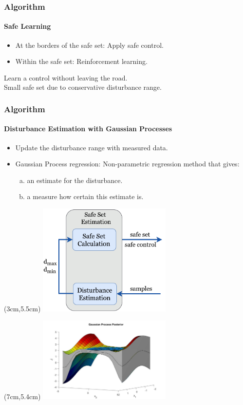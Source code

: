 \documentclass[t]{beamer}
\begin{document}
\begin{frame}
\frametitle{Algorithm}
\framesubtitle{Safe Learning}
\begin{itemize}
\item At the borders of the safe set: Apply safe control.
\item Within the safe set: Reinforcement learning.
\end{itemize}
\vspace{1cm}
 Learn a control without leaving the road.\\
 Small safe set due to conservative disturbance range.
\end{frame}

\begin{frame}
\frametitle{Algorithm}
\framesubtitle{Disturbance Estimation with Gaussian Processes}
\begin{itemize}
\item Update the disturbance range with measured data.
\item Gaussian Process regression: Non-parametric regression method that gives:
\begin{enumerate}[a.]
\item an estimate for the disturbance.
\item a measure how certain this estimate is.
\end{enumerate}
\end{itemize}
\begin{textblock*}{6.3cm}(3cm,5.5cm) %
\includegraphics[trim=0mm 0mm 0mm 0mm, width=0.5\textwidth]{safetyloop}
\end{textblock*}
\begin{textblock*}{9.5cm}(7cm,5.4cm) %
\includegraphics[trim=0mm 0mm 0mm 0mm, width=0.5\textwidth]{GP_idea}
\end{textblock*}
\end{frame}
\end{document}
